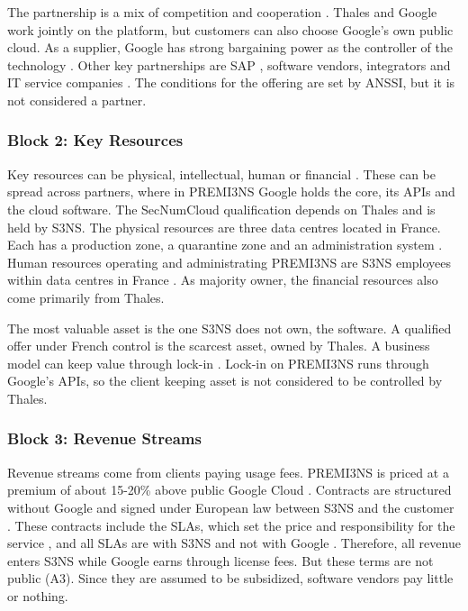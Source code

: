 The partnership is a mix of competition and cooperation \parencite[p.~116]{overby2021}. Thales and Google work jointly on the platform, but customers can also choose Google's own public cloud. As a supplier, Google has strong bargaining power as the controller of the technology \parencite[p.~114]{overby2021}. Other key partnerships are SAP \parencite{thalessap2026}, software vendors, integrators and IT service companies \parencite{s3nsecosystem}. The conditions for the offering are set by ANSSI, but it is not considered a partner.

\subsubsection{Block 2: Key Resources}
Key resources can be physical, intellectual, human or financial \parencite[pp.~34--35]{osterwalder2010}. These can be spread across partners, where in PREMI3NS Google holds the core, its APIs and the cloud software. The SecNumCloud qualification depends on Thales and is held by S3NS. The physical resources are three data centres located in France. Each has a production zone, a quarantine zone and an administration system \parencite{paperjam2026}. Human resources operating and administrating PREMI3NS are S3NS employees within data centres in France \parencite{s3ns2025premi3ns}. As majority owner, the financial resources also come primarily from Thales.

The most valuable asset is the one S3NS does not own, the software. A qualified offer under French control is the scarcest asset, owned by Thales. A business model can keep value through lock-in \parencite[p.~283]{overby2021}. Lock-in on PREMI3NS runs through Google's APIs, so the client keeping asset is not considered to be controlled by Thales. 

\subsubsection{Block 3: Revenue Streams}
Revenue streams come from clients paying usage fees. PREMI3NS is priced at a premium of about 15-20\% above public Google Cloud \parencite{paperjam2026}. Contracts are structured without Google and signed under European law between S3NS and the customer \parencite{paperjam2026}. These contracts include the SLAs, which set the price and responsibility for the service \parencite[p.~247]{overby2021}, and all SLAs are with S3NS and not with Google \parencite{s3nsdocs_keydiff}. Therefore, all revenue enters S3NS while Google earns through license fees. But these terms are not public (A3). Since they are assumed to be subsidized, software vendors pay little or nothing. 

